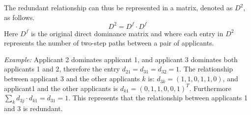 \documentclass[12pt,english]{report}
\begin{document}
The redundant relationship can thus be represented in a matrix, denoted as
$D^2$, 
as follows. $$D^2 = D^{f} \cdot D^{f} $$  Here $D^f$ is the original direct
dominance 
matrix and where each entry in $D^2$ represents the number of
two-step paths between a pair of applicants.
 
\textit{Example:} Applicant 2 dominates applicant 1, and applicant 3 dominates
both applicants 1 and 2, therefore the entry $d_{21}=d_{31}=d_{32}=1$. The
relationship between applicant 3 and the other applicants $k$ is:
$d_{3k}=(1,1,0,1,1,0)$, and applicant1 and the other applicants is
$d_{k1}=(0,1,1,0,0,1) ^T $. Furthermore $\sum_k d_{3j} \cdot d_{k1}=d_{31}=1$.
This represents that the relationship between applicants 1 and 3 is redundant.


\begin{figure}
\begin{floatrow}
\capbtabbox{%
	\begin{tabular}{l|llllll}
		& 1 & 2 & 3 & 4 & 5 & 6 \\ \hline
		1 & 0 & 0 & 0 & 0 & 0 & 0 \\
		2 & 0 & 0 & 0 & 0 & 0 & 0 \\
		3 & 1 & 0 & 0 & 1 & 1 & 0 \\
		4 & 0 & 0 & 0 & 0 & 0 & 0 \\
		5 & 0 & 0 & 0 & 0 & 0 & 0 \\
		6 & 1 & 1 & 0 & 1 & 1 & 0 \\
	\end{tabular}
	\label{domin_matrix2}%
}{%
\caption{Redundant Dominance Relation in Matrix}%
\label{redundant1}
}
\end{floatrow}
\end{figure}
\end{document}
